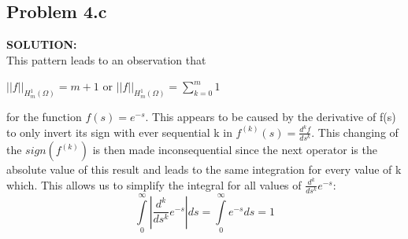 \documentclass[10pt,a4paper]{article}
\begin{document}
\subsection{Problem 4.c}
\begin{tcolorbox}
\textbf{SOLUTION:}\\
This pattern leads to an observation that 
\begin{center}
$||f||_{H_{m}^1(\Omega)}=m+1$   or   $||f||_{H_{m}^1(\Omega)}=\sum\limits_{k=0}^m 1$
\end{center}

for the function $f(s) = e^{-s}$.  This appears to be caused by the derivative of f(s) to only invert its sign with ever sequential k in $f^{(k)}(s)=\frac{d^k f}{ds^k}$.  This changing of the $sign(f^{(k)})$ is then made inconsequential since the next operator is the absolute value of this result and leads to the same integration for every value of k which.  This allows us to simplify the integral for all values of $\frac{d^k}{ds^k}e^{-s}$:
$$\int\limits_{0}^\infty|\frac{d^k}{ds^k}e^{-s}|ds=\int\limits_{0}^\infty e^{-s}ds = 1$$

\end{tcolorbox}
\end{document}
